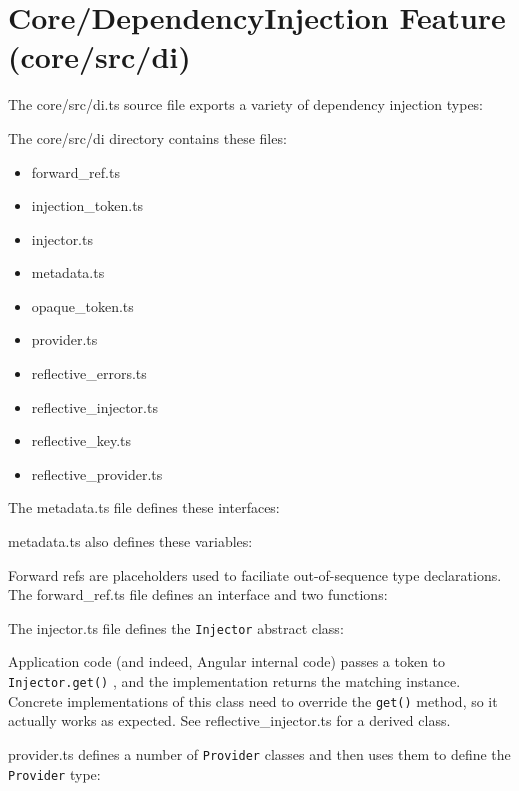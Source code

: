 \section{Core/DependencyInjection Feature (core/src/di)}

The core/src/di.ts source file exports a variety of dependency injection types:



The core/src/di directory contains these files:

\begin{itemize}
  \item forward\_ref.ts
  \item injection\_token.ts
  \item injector.ts
  \item metadata.ts
  \item opaque\_token.ts
  \item provider.ts
  \item reflective\_errors.ts
  \item reflective\_injector.ts
  \item reflective\_key.ts
  \item reflective\_provider.ts
\end{itemize}

The metadata.ts file defines these interfaces:



metadata.ts also defines these variables:



Forward refs are placeholders used to faciliate out-of-sequence type declarations. The
forward\_ref.ts file defines an interface and two functions:



The injector.ts file defines the
\texttt{Injector}
abstract class:



Application code (and indeed, Angular internal code) passes a token to
\texttt{Injector.get()}
, and the implementation returns the matching instance. Concrete
implementations of this class need to override the
\texttt{get()}
method, so it actually works
as expected. See reflective\_injector.ts for a derived class.

provider.ts defines a number of
\texttt{Provider}
classes and then uses them to define the
\texttt{Provider}
type:



